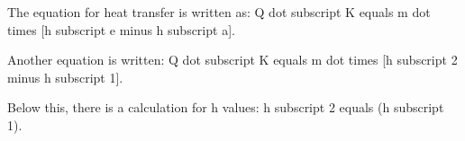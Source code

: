 The equation for heat transfer is written as:  
Q dot subscript K equals m dot times [h subscript e minus h subscript a].  

Another equation is written:  
Q dot subscript K equals m dot times [h subscript 2 minus h subscript 1].  

Below this, there is a calculation for h values:  
h subscript 2 equals (h subscript 1).